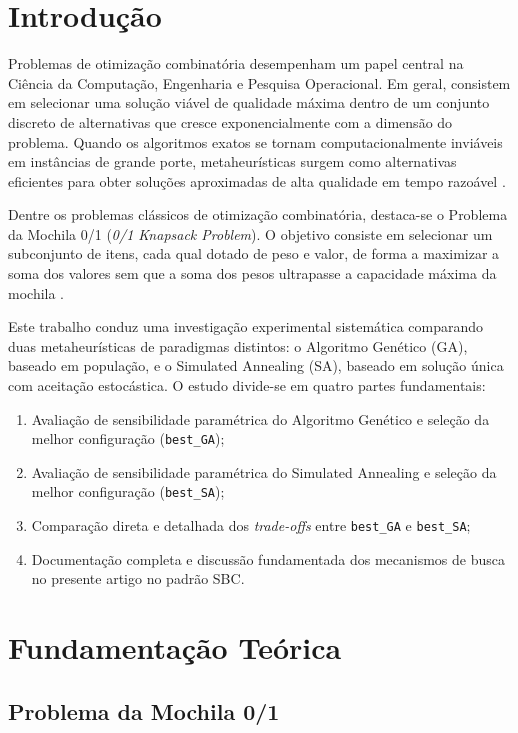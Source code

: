 \documentclass[12pt]{article}
\begin{document}
\section{Introdução}

Problemas de otimização combinatória desempenham um papel central na Ciência da Computação, Engenharia e Pesquisa Operacional. Em geral, consistem em selecionar uma solução viável de qualidade máxima dentro de um conjunto discreto de alternativas que cresce exponencialmente com a dimensão do problema. Quando os algoritmos exatos se tornam computacionalmente inviáveis em instâncias de grande porte, metaheurísticas surgem como alternativas eficientes para obter soluções aproximadas de alta qualidade em tempo razoável \cite{talbi2009}.

Dentre os problemas clássicos de otimização combinatória, destaca-se o Problema da Mochila 0/1 (\textit{0/1 Knapsack Problem}). O objetivo consiste em selecionar um subconjunto de itens, cada qual dotado de peso e valor, de forma a maximizar a soma dos valores sem que a soma dos pesos ultrapasse a capacidade máxima da mochila \cite{ortools_knapsack}.

Este trabalho conduz uma investigação experimental sistemática comparando duas metaheurísticas de paradigmas distintos: o Algoritmo Genético (GA), baseado em população, e o Simulated Annealing (SA), baseado em solução única com aceitação estocástica. O estudo divide-se em quatro partes fundamentais:
\begin{enumerate}
    \item Avaliação de sensibilidade paramétrica do Algoritmo Genético e seleção da melhor configuração (\texttt{best\_GA});
    \item Avaliação de sensibilidade paramétrica do Simulated Annealing e seleção da melhor configuração (\texttt{best\_SA});
    \item Comparação direta e detalhada dos \textit{trade-offs} entre \texttt{best\_GA} e \texttt{best\_SA};
    \item Documentação completa e discussão fundamentada dos mecanismos de busca no presente artigo no padrão SBC.
\end{enumerate}

\section{Fundamentação Teórica}

\subsection{Problema da Mochila 0/1}
\end{document}
